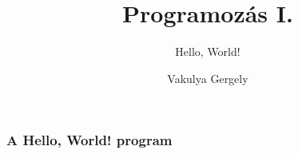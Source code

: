 \documentclass[
	11pt, %
]{beamer}
\title{Programozás I.}
\subtitle{Hello, World!}
\author{Vakulya Gergely}
\institute[UC]{Óbudai Egyetem, AMK \\ \smallskip \textit{vakulya.gergely@amk.uni-obuda.hu}}
\date{}
\begin{document}
\begin{frame}

  \titlepage

\end{frame}

\begin{frame}
  \frametitle{A Hello, World! program}

  \begin{verbatim}

  \end{verbatim}

\end{frame}
\end{document}
